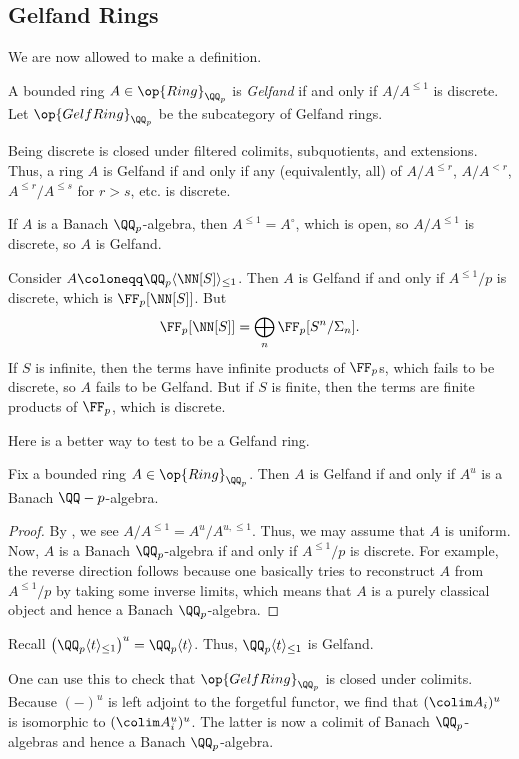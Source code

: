 \documentclass{article}
\begin{document}
\subsection{Gelfand Rings}
We are now allowed to make a definition.
\begin{definition}[Gelfand]
	A bounded ring $A\in\op{Ring}_{\QQ_p}$ is \textit{Gelfand} if and only if $A/A^{\le1}$ is discrete. Let $\op{GelfRing}_{\QQ_p}$ be the subcategory of Gelfand rings.
\end{definition}
\begin{remark}
	Being discrete is closed under filtered colimits, subquotients, and extensions. Thus, a ring $A$ is Gelfand if and only if any (equivalently, all) of $A/A^{\le r}$, $A/A^{<r}$, $A^{\le r}/A^{\le s}$ for $r>s$, etc. is discrete.
\end{remark}
\begin{example}
	If $A$ is a Banach $\QQ_p$-algebra, then $A^{\le1}=A^\circ$, which is open, so $A/A^{\le1}$ is discrete, so $A$ is Gelfand.
\end{example}
\begin{example}
	Consider $A\coloneqq\QQ_p\langle\NN[S]\rangle_{\le1}$. Then $A$ is Gelfand if and only if $A^{\le1}/p$ is discrete, which is $\FF_p[\NN[S]]$. But
	\[\FF_p[\NN[S]]=\bigoplus_n\FF_p[S^n/\Sigma_n].\]
	If $S$ is infinite, then the terms have infinite products of $\FF_p$s, which fails to be discrete, so $A$ fails to be Gelfand. But if $S$ is finite, then the terms are finite products of $\FF_p$, which is discrete.
\end{example}
Here is a better way to test to be a Gelfand ring.
\begin{lemma}
	Fix a bounded ring $A\in\op{Ring}_{\QQ_p}$. Then $A$ is Gelfand if and only if $A^u$ is a Banach $\QQ-p$-algebra.
\end{lemma}
\begin{proof}
	By , we see $A/A^{\le1}=A^u/A^{u,\le1}$. Thus, we may assume that $A$ is uniform. Now, $A$ is a Banach $\QQ_p$-algebra if and only if $A^{\le1}/p$ is discrete. For example, the reverse direction follows because one basically tries to reconstruct $A$ from $A^{\le1}/p$ by taking some inverse limits, which means that $A$ is a purely classical object and hence a Banach $\QQ_p$-algebra.
\end{proof}
\begin{example}
	Recall $\left(\QQ_p\langle t\rangle_{\le1}\right)^u=\QQ_p\langle t\rangle$. Thus, $\QQ_p\langle t\rangle_{\le1}$ is Gelfand.
\end{example}
\begin{remark}
	One can use this to check that $\op{GelfRing}_{\QQ_p}$ is closed under colimits. Because $(-)^u$ is left adjoint to the forgetful functor, we find that $(\colim A_i)^u$ is isomorphic to $(\colim A_i^u)^u$. The latter is now a colimit of Banach $\QQ_p$-algebras and hence a Banach $\QQ_p$-algebra.
\end{remark}
\end{document}
